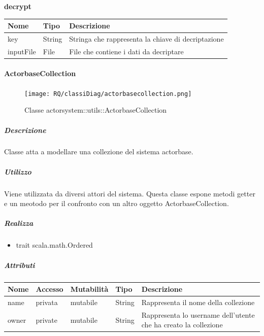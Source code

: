 \documentclass{scalatekids-article}
\begin{document}
\begin{center}
  \textbf{decrypt}\\
\end{center}
\begin{tabular}{| l | l | l |}
  \hline
  Nome & Tipo & Descrizione\\
  \hline
  key & String & Stringa che rappresenta la chiave di decriptazione \\
  \hline
  inputFile & File & File che contiene i dati da decriptare \\
  \hline
\end{tabular}


\paragraph{ActorbaseCollection}
\label{sec:actorbase::actorsystem::utils::ActorbaseCollection}

\begin{figure}[H]
   \begin{center}
     \texttt{[image: RQ/classiDiag/actorbasecollection.png]}
     \caption{Classe actorsystem::utils::ActorbaseCollection}
   \end{center}
 \end{figure}

\subparagraph{Descrizione}
Classe atta a modellare una collezione del sistema actorbase.

\subparagraph{Utilizzo}
Viene utilizzata da diversi attori del sistema. Questa classe espone metodi
getter e un meotodo per il confronto con un altro oggetto ActorbaseCollection.

\subparagraph{Realizza}
\begin{itemize}
\item trait scala.math.Ordered
\end{itemize}

\subparagraph{Attributi}
\begin{tabular}{| p{3cm} | p{1.5cm} | p{2cm} | p{2cm} | p{8.5cm} |}
  \hline
  Nome & Accesso & Mutabilità & Tipo & Descrizione\\
  \hline
  name & privata & mutabile & String & Rappresenta il nome della collezione \\
  \hline
  owner & private & mutabile & String & Rappresenta lo username dell'utente che ha creato la collezione \\
  \hline
\end{tabular}
\end{document}
